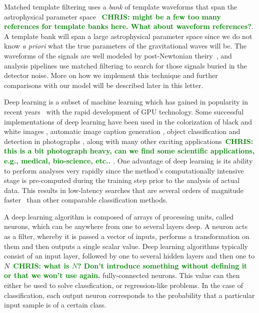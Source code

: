 \documentclass[%
 amsmath,amssymb,
 aps,
 twocolumn,
 prl,
 reprint,
floatfix,
]{revtex4-1}
\newcommand{\chris}[1]{\textbf{\textcolor{green}{CHRIS: #1}}}
\begin{document}
%
%
Matched template filtering uses a \textit{bank} of template waveforms that span
the astrophysical parameter space \cite{PhysRevD.44.3819, PhysRevD.49.1707,
PhysRevD.53.6749, PhysRevD.60.022002, 0264-9381-23-18-002, PhysRevD.80.104014,
PhysRevD.86.084017, PhysRevD.89.084041, PhysRevD.87.124003, 1307.4158,
PhysRevD.89.024003, PhysRevD.93.124007}~\chris{might be a few too many
references for template banks here. What about waveform references?}. A
template bank will span a large astrophysical parameter space since we do not
know \textit{a priori} what the true parameters of the gravitational waves will
be. The waveforms of the signals are well modeled by post-Newtonian
theiry~\cite{PhysRevD.84.049901,PhysRevD.80.084043,Blanchet2014,PhysRevD.93.084054},
and analysis pipelines use matched filtering to search for those signals buried
in the detector noise. More on how we implement this technique and further
comparisons with our model will be described later in this letter.

%
%
Deep learning is a subset of machine learning which has gained in popularity in
recent years~\cite{NIPS2012_4824, 1406.2661, 1409.1556, 1412.7062, 1311.2901,
1409.4842} with the rapid development of \ac{GPU} technology. Some successful
implementations of deep learning have been used in the colorization of black
and white images \cite{1603.08511}, automatic image caption generation
\cite{1412.2306}, object classification and detection in photographs
\cite{NIPS2012_4824}, along with many other exciting applications~\chris{this
is a bit photograph heavy, can we find some scientific applications, e.g.,
medical, bio-science, etc.. }. One advantage of deep learning is its ability to
perform analyses very rapidly since the method's computationally intensive
stage is pre-computed during the training step prior to the analysis of actual
data. This results in low-latency searches that are several orders of magnitude
faster~\cite{726791} than other comparable classification methods. 

%
%
A deep learning algorithm is composed of arrays of processing units, called
neurons, which can be anywhere from one to several layers deep. A neuron acts
as a filter, whereby it is passed a vector of inputs, performs a transformation
on them and then outputs a single scalar value. Deep learning algorithms
typically consist of an input layer, followed by one to several hidden layers
and then one to $N$~\chris{what is $N$? Don't introduce something without
defining it or that we won't use again.} fully-connected neurons. This value
can then either be used to solve classfication, or regression-like problems. In
the case of classification, each output neuron corresponds to the probability
that a particular input sample is of a certain class.
\end{document}

